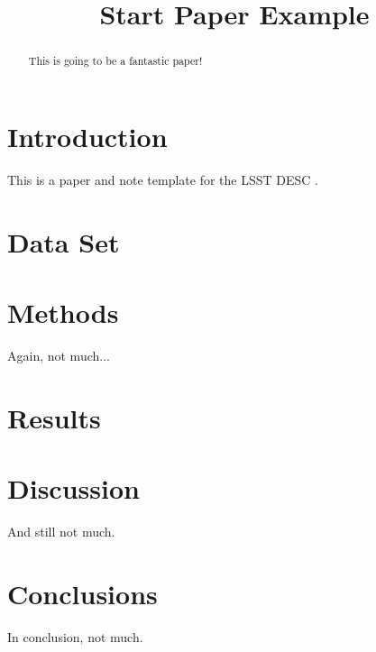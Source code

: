 \documentclass[preprint]{aastex}
\begin{document}
 

\title{Start Paper Example}


\begin{abstract}

This is going to be a fantastic paper!

\end{abstract}

\maketitle

\section{Introduction}
\label{sec:intro}

This is a paper and note template for the LSST DESC \citep{Overview,ScienceBook,WhitePaper}. 

\section{Data Set}
\label{sec:data}



\section{Methods}
\label{sec:methods}

Again, not much...

\section{Results}
\label{sec:results}


%

\section{Discussion}
\label{sec:discussion}

And still not much.

\section{Conclusions}
\label{sec:conclusions}

In conclusion, not much.





\end{document}
